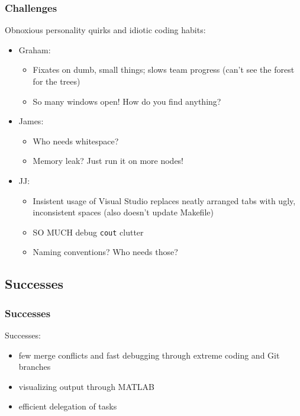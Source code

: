 \documentclass[usernames,dvipsnames]{beamer}
\begin{document}
\begin{frame}	
	\frametitle{Challenges}
	
	\begin{alertblock}{Obnoxious personality quirks and idiotic coding habits:}
		\begin{itemize}
			\setlength\itemsep{0.5pt}
			\item Graham: \\
				\begin{itemize}
					\setlength\itemsep{0.5pt}
					\item Fixates on dumb, small things; slows team progress (can't see the forest for the trees)
					\item So many windows open! How do you find anything?
				\end{itemize}
			\item James: \\
				\begin{itemize}
					\setlength\itemsep{0.5pt}
					\item Who needs whitespace?
					\item Memory leak? Just run it on more nodes!
				\end{itemize}
			\item JJ: \\
				\begin{itemize}
					\setlength\itemsep{0.5pt}
					\item Insistent usage of Visual Studio replaces neatly arranged tabs with ugly, inconsistent spaces (also doesn't update Makefile)
					\item SO MUCH debug \texttt{cout} clutter
					\item Naming conventions? Who needs those?
				\end{itemize}
		\end{itemize}
	\end{alertblock}

\end{frame}

\subsection{Successes}

\begin{frame}	
	\frametitle{Successes}
	
	\begin{exampleblock}{Successes:}
		\begin{itemize}
			\item few merge conflicts and fast debugging through extreme coding and Git branches
			\item visualizing output through MATLAB
			\item efficient delegation of tasks
		\end{itemize}
	\end{exampleblock}

\end{frame}
\end{document}
